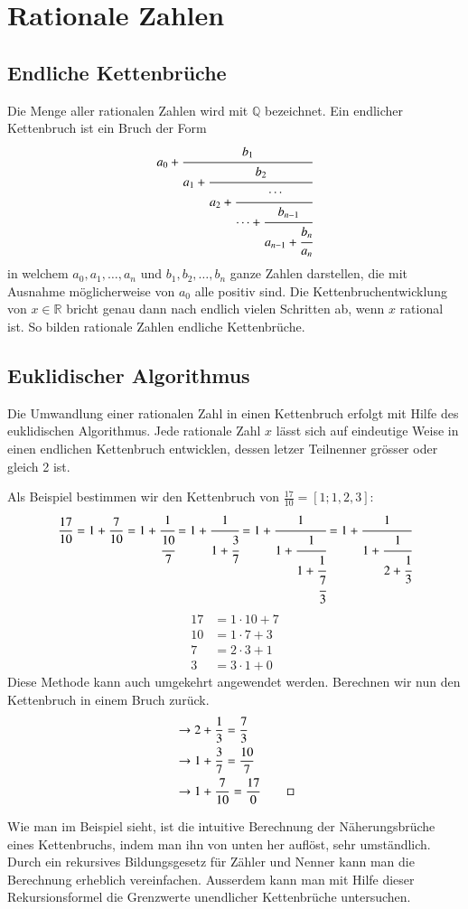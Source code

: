 
%
%
%
\section{Rationale Zahlen
\label{kettenbruch:section:Zahlen}}
\subsection{Endliche Kettenbrüche}
Die Menge aller rationalen Zahlen wird mit $\mathbb{Q}$ bezeichnet.
Ein endlicher Kettenbruch ist ein Bruch der Form
\begin{equation}
a_0 + \cfrac{b_1}{a_1+\cfrac{b_2}{a_2+\cfrac{\cdots}{\cdots+\cfrac{b_{n-1}}{a_{n-1} + \cfrac{b_n}{a_n}}}}}
\end{equation}
in welchem $a_0, a_1,\dots,a_n$ und $b_1,b_2,\dots,b_n$ ganze Zahlen
darstellen, die mit Ausnahme möglicherweise von $a_0$ alle positiv sind.
Die Kettenbruchentwicklung von $x \in \mathbb{R}$ bricht genau dann
nach endlich vielen Schritten ab, wenn $x$ rational ist. So bilden
rationale Zahlen endliche Kettenbrüche.

\subsection{Euklidischer Algorithmus}
Die Umwandlung einer rationalen Zahl in einen Kettenbruch erfolgt
mit Hilfe des euklidischen Algorithmus.
Jede rationale Zahl $x$ lässt sich auf eindeutige Weise in einen
endlichen Kettenbruch entwicklen, dessen letzer Teilnenner grösser
oder gleich 2 ist.
\begin{beispiel}
Als Beispiel bestimmen wir den Kettenbruch von $\frac{17}{10} = [1;1,2,3]$:
\begin{equation}
\frac{17}{10}
=
1 + \frac{7}{10}
=
1 + \cfrac{1}{\cfrac{10}{7}}
=
1 + \cfrac{1}{1+\cfrac{3}{7}}
=
1 + \cfrac{1}{1+\cfrac{1}{1+\cfrac{1}{\cfrac{7}{3}}}}
=
1 + \cfrac{1}{1+\cfrac{1}{2+\cfrac{1}{3}}}
\end{equation}
\begin{align*}
17 &= 1\cdot 10 + 7 \\
10 &= 1\cdot 7 + 3 \\
7 &= 2\cdot 3 + 1 \\
3 &= 3\cdot 1 + 0
\end{align*}
Diese Methode kann auch umgekehrt angewendet werden.
Berechnen wir nun den Kettenbruch in einem Bruch zurück.
\begin{align*}
[1;1,2,3] 	
&\rightarrow 	2 + \frac{1}{3} = \frac{7}{3} \\
&\rightarrow 	1 + \frac{3}{7} = \frac{10}{7} \\
&\rightarrow 	1 + \frac{7}{10} = \frac{17}{0} 
\qedhere
\end{align*}
\end{beispiel}
Wie man im Beispiel sieht, ist die intuitive Berechnung der
Näherungsbrüche eines Kettenbruchs, indem man ihn von unten her
auflöst, sehr umständlich. Durch ein rekursives Bildungsgesetz für
Zähler und Nenner kann man die Berechnung erheblich vereinfachen.
Ausserdem kann man mit Hilfe dieser Rekursionsformel die Grenzwerte
unendlicher Kettenbrüche untersuchen.

